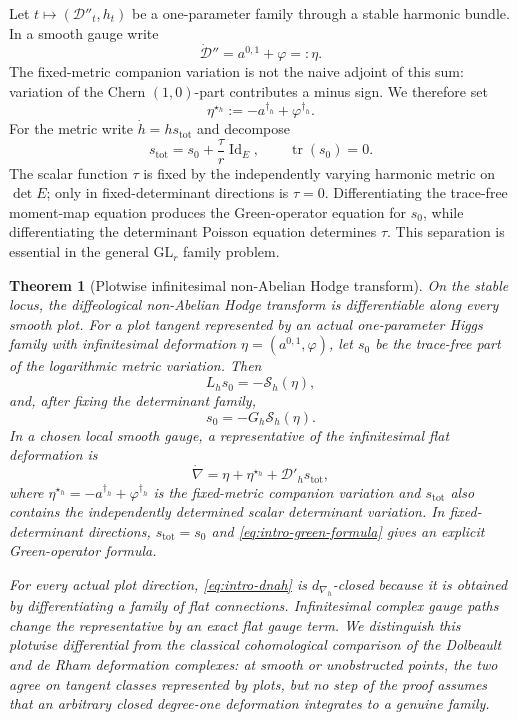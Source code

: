 \documentclass[11pt,reqno]{amsart}
\newtheorem{theorem}{Theorem}[section]
\theoremstyle{definition}
\theoremstyle{remark}
\newcommand{\cD}{\mathcal D}
\newcommand{\cS}{\mathcal S}
\newcommand{\Id}{\operatorname{Id}}
\newcommand{\tr}{\operatorname{tr}}
\begin{document}
Let $t\mapsto (\cD''_t,h_t)$ be a one-parameter family through a stable harmonic bundle.  In a smooth gauge write
\[
  \dot{\cD}''=a^{0,1}+\varphi=: \eta.
\]
The fixed-metric companion variation is not the naive adjoint of this sum: variation of the Chern $(1,0)$-part contributes a minus sign.  We therefore set
\[
  \eta^{\star_h}:=-a^{\dagger_h}+\varphi^{\dagger_h}.
\]
For the metric write $\dot h=h s_{\mathrm{tot}}$ and decompose
\[
  s_{\mathrm{tot}}=s_0+\frac{\tau}{r}\Id_E,
  \qquad \tr(s_0)=0.
\]
The scalar function $\tau$ is fixed by the independently varying harmonic metric on $\det E$; only in fixed-determinant directions is $\tau=0$.  Differentiating the trace-free moment-map equation produces the Green-operator equation for $s_0$, while differentiating the determinant Poisson equation determines $\tau$.  This separation is essential in the general $\mathrm{GL}_r$ family problem.

\begin{theorem}[Plotwise infinitesimal non-Abelian Hodge transform]\label{thm:intro-infinitesimal}
On the stable locus, the diffeological non-Abelian Hodge transform is differentiable along every smooth plot.  For a plot tangent represented by an actual one-parameter Higgs family with infinitesimal deformation $\eta=(a^{0,1},\varphi)$, let $s_0$ be the trace-free part of the logarithmic metric variation.  Then
\begin{equation}\label{eq:intro-first-variation}
  L_hs_0=-\cS_h(\eta),
\end{equation}
and, after fixing the determinant family,
\begin{equation}\label{eq:intro-green-formula}
  s_0=-G_h\cS_h(\eta).
\end{equation}
In a chosen local smooth gauge, a representative of the infinitesimal flat deformation is
\begin{equation}\label{eq:intro-dnah}
  \dot\nabla
  =\eta+\eta^{\star_h}+\cD'_h s_{\mathrm{tot}},
\end{equation}
where $\eta^{\star_h}=-a^{\dagger_h}+\varphi^{\dagger_h}$ is the fixed-metric companion variation and $s_{\mathrm{tot}}$ also contains the independently determined scalar determinant variation.  In fixed-determinant directions, $s_{\mathrm{tot}}=s_0$ and \eqref{eq:intro-green-formula} gives an explicit Green-operator formula.

For every actual plot direction, \eqref{eq:intro-dnah} is $d_{\nabla_h}$-closed because it is obtained by differentiating a family of flat connections.  Infinitesimal complex gauge paths change the representative by an exact flat gauge term.  We distinguish this plotwise differential from the classical cohomological comparison of the Dolbeault and de Rham deformation complexes: at smooth or unobstructed points, the two agree on tangent classes represented by plots, but no step of the proof assumes that an arbitrary closed degree-one deformation integrates to a genuine family.
\end{theorem}
\end{document}
